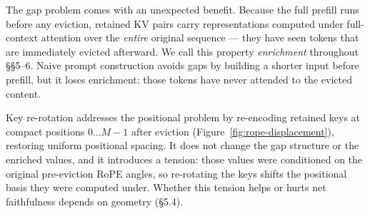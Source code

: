 \documentclass[10pt,letterpaper]{article}
\begin{document}
The gap problem comes with an unexpected benefit. Because the full
prefill runs before any eviction, retained KV pairs carry
representations computed under full-context attention over the
\emph{entire} original sequence --- they have seen tokens that are
immediately evicted afterward. We call this property \emph{enrichment}
throughout §§5--6. Naive prompt construction avoids gaps by building a
shorter input before prefill, but it loses enrichment: those tokens
have never attended to the evicted content.

Key re-rotation addresses the positional problem by re-encoding retained
keys at compact positions \(0 \ldots M-1\) after eviction
(Figure~\ref{fig:rope-displacement}), restoring uniform positional
spacing. It does not change the gap structure or the enriched values,
and it introduces a tension: those values were conditioned on the
original pre-eviction RoPE angles, so re-rotating the keys shifts the
positional basis they were computed under. Whether this tension helps or
hurts net faithfulness depends on geometry (§5.4).
\end{document}
